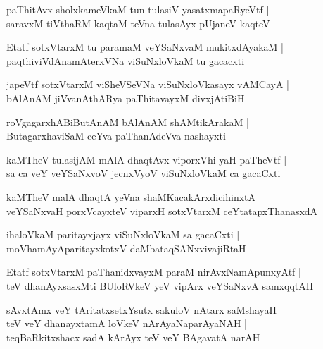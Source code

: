 \documentclass[twoside,12pt,openright]{book}
\newcounter{shloka}[chapter]
\begin{document}
\begin{shloka}%
paThitAvx sholxkameVkaM tun tulasiV yasatxmapaRyeVtf |\\
saravxM tiVthaRM kaqtaM teVna tulasAyx pUjaneV kaqteV 
\end{shloka}

\begin{shloka}%
Etatf sotxVtarxM tu paramaM veYSaNxvaM mukitxdAyakaM |\\
paqthiviVdAnamAterxVNa viSuNxloVkaM tu gacacxti 
\end{shloka}

\begin{shloka}%
japeVtf sotxVtarxM viSheVSeVNa viSuNxloVkasayx vAMCayA |\\
bAlAnAM jiVvanAthARya paThitavayxM divxjAtiBiH 
\end{shloka}

\begin{shloka}%
roVgagarxhABiButAnAM bAlAnAM shAMtikArakaM |\\
ButagarxhaviSaM ceYva paThanAdeVva nashayxti 
\end{shloka}

\begin{shloka}%
kaMTheV tulasijAM mAlA dhaqtAvx viporxVhi yaH paTheVtf |\\
sa ca veY veYSaNxvoV jecnxVyoV viSuNxloVkaM ca gacaCxti
\end{shloka}

\begin{shloka}%
kaMTheV malA dhaqtA yeVna shaMKacakArxdicihinxtA |\\
veYSaNxvaH porxVcayxteV viparxH sotxVtarxM ceYtatapxThanasxdA 
\end{shloka}

\begin{shloka}%
ihaloVkaM paritayxjayx viSuNxloVkaM sa gacaCxti |\\
moVhamAyAparitayxkotxV daMbataqSANxvivajiRtaH
\end{shloka}

\begin{shloka}%
Etatf sotxVtarxM paThanidxvayxM paraM nirAvxNamApunxyAtf |\\
teV dhanAyxsasxMti BUloRVkeV yeV vipArx veYSaNxvA samxqqtAH 
\end{shloka}

\begin{shloka}%
sAvxtAmx veY tAritatxsetxYsutx sakuloV nAtarx saMshayaH |\\
teV veY dhanayxtamA loVkeV nArAyaNaparAyaNAH |\\
teqBaRkitxshacx sadA kArAyx teV veY BAgavatA narAH 
\end{shloka}
\end{document}
